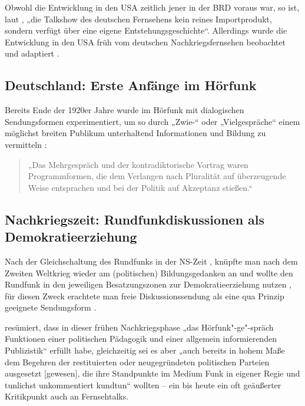 Obwohl die Entwicklung in den USA zeitlich jener in der BRD voraus war, so ist, laut \textcite[59]{kellerGeschichteTalkshowDeutschland2009}, „die Talkshow des deutschen Fernsehens kein reines Importprodukt, sondern verfügt über eine eigene Entstehungsgeschichte“. Allerdings wurde die Entwicklung in den USA früh vom deutschen Nachkriegsfernsehen beobachtet und adaptiert \parencite[104-110]{mahloZurDiskussionUm1956}.

\subsection{Deutschland: Erste Anfänge im Hörfunk}

Bereits Ende der 1920er Jahre wurde im Hörfunk mit dialogischen Sendungsformen experimentiert, um so durch „Zwie-“ oder „Vielgespräche“ einem möglichst breiten Publikum unterhaltend Informationen und Bildung zu vermitteln \parencite[61ff.]{kellerGeschichteTalkshowDeutschland2009}:

\begin{quote}
	„Das Mehrgespräch und der kontradiktorische Vortrag waren Programmformen, die dem Verlangen nach Pluralität auf überzeugende Weise entsprachen und bei der Politik auf Akzeptanz stießen.“ \parencite[66]{kellerGeschichteTalkshowDeutschland2009}
\end{quote}

\subsection{Nachkriegszeit: Rundfunkdiskussionen als Demokratieerziehung}

Nach der Gleichschaltung des Rundfunks in der NS-Zeit \parencite[67-69]{kellerGeschichteTalkshowDeutschland2009}, knüpfte man nach dem Zweiten Weltkrieg wieder am (politischen) Bildungsgedanken an und wollte den Rundfunk in den jeweiligen Besatzungszonen zur Demokratieerziehung nutzen \parencite[71]{kellerGeschichteTalkshowDeutschland2009}, für diesen Zweck erachtete man freie Diskussionssendung als eine qua Prinzip geeignete Sendungsform \parencite[82]{kellerGeschichteTalkshowDeutschland2009}.

\textcite[86]{kellerGeschichteTalkshowDeutschland2009} resümiert, dass in dieser frühen Nachkriegsphase „das Hörfunk"-ge"-spräch Funktionen einer politischen Pädagogik und einer allgemein informierenden Publizistik“ erfüllt habe, gleichzeitig sei es aber „auch bereits in hohem Maße dem Begehren der restituierten oder neugegründeten politischen Parteien ausgesetzt [gewesen], die ihre Standpunkte im Medium Funk in eigener Regie und tunlichst unkommentiert kundtun“ wollten – ein bis heute ein oft geäußerter Kritikpunkt auch an Fernsehtalks.

